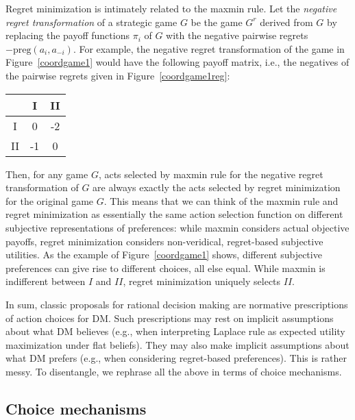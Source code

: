 \documentclass[fleqn,reqno,11pt]{article}
\begin{document}

  

Regret minimization is intimately related to the maxmin rule. Let the \emph{negative regret
  transformation} of a strategic game $G$ be the game $G^r$ derived from $G$ by replacing the payoff
functions $\pi_i$ of $G$ with the negative pairwise regrets $-\text{preg}(a_i,a_{-i})$. For
example, the negative regret transformation of the game in Figure~\ref{coordgame1} would have the
following payoff matrix, i.e., the negatives of the pairwise regrets given in
Figure~\ref{coordgame1reg}:

\begin{center}
    \begin{tabular}{ccc}
      \toprule
      & I & II \\
      \midrule
      I & 0 & -2 \\
      II & -1 & 0\\
      \bottomrule
    \end{tabular}
\end{center}

\noindent Then, for any game $G$, acts selected by maxmin rule for the negative regret transformation of $G$ are
always exactly the acts selected by regret minimization for the original game $G$.
This means that we can think of the maxmin rule and regret minimization as essentially the same
action selection function on different subjective representations of preferences: while maxmin considers actual
objective payoffs, regret minimization considers non-veridical, regret-based subjective
utilities. As the example of Figure~\ref{coordgame1} shows, different subjective preferences
can give rise to different choices, all else equal. While maxmin is indifferent
between $I$ and $II$, regret minimization uniquely selects $II$.

In sum, classic proposals for rational decision making are normative prescriptions of action choices
for DM. Such prescriptions may rest on implicit assumptions about what DM
believes (e.g., when interpreting Laplace rule as expected utility maximization under flat beliefs). They may
also make implicit assumptions about what DM prefers (e.g., when considering regret-based preferences). This is rather messy. To disentangle, we rephrase all the above in terms of choice mechanisms.

\subsection{Choice mechanisms}
\label{sec:choice-mechanisms}
\end{document}
